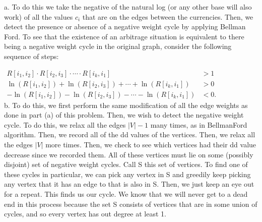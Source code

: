\documentclass[a4paper, justified]{tufte-handout}
\begin{document}
\begin{solution}
	a. To do this we take the negative of the natural log (or any other base will also work) of all the values $c_i$ that are on the edges between the currencies. Then, we detect the presence or absence of a negative weight cycle by applying Bellman Ford. To see that the existence of an arbitrage situation is equivalent to there being a negative weight cycle in the original graph, consider the following sequence of steps:

	$\begin{aligned} R[i_1, i_2] · R[i_2, i_3] \cdot \cdots \cdot R[i_k, i_1] & > 1 \\ \ln(R[i_1, i_2]) + \ln(R[i_2, i_3]) + \cdots + \ln(R[i_k, i_1]) & > 0 \\ −\ln(R[i_1, i_2]) − \ln(R[i_2, i_3]) − \cdots − \ln(R[i_k, i_1]) & < 0. \end{aligned}$\\

	b. To do this, we first perform the same modification of all the edge weights as done in part (a) of this problem. Then, we wish to detect the negative weight cycle. To do this, we relax all the edges $|V| − 1$ many times, as in BellmanFord algorithm. Then, we record all of the dd values of the vertices. Then, we relax all the edges $|V|$ more times. Then, we check to see which vertices had their dd value decrease since we recorded them. All of these vertices must lie on some (possibly disjoint) set of negative weight cycles. Call S this set of vertices. To find one of these cycles in particular, we can pick any vertex in S and greedily keep picking any vertex that it has an edge to that is also in S. Then, we just keep an eye out for a repeat. This finds us our cycle. We know that we will never get to a dead end in this process because the set S consists of vertices that are in some union of cycles, and so every vertex has out degree at least 1.
\end{solution}



\beginoptional

\begin{problem}[TC Problem 24-2]
\end{problem}

\begin{solution}
\end{solution}
\end{document}
